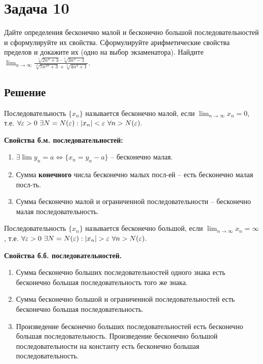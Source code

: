 \section*{Задача 10}

Дайте определения бесконечно малой и бесконечно большой последовательностей и сформулируйте их свойства. Сформулируйте арифметические свойства пределов и докажите их (одно на
выбор экзаменатора). Найдите $\displaystyle \lim_{n\rightarrow \infty} 
        \frac{
               \sqrt[5]{2n^4 + 3} \cdot 
               \sqrt[7]{3n^3 - 1}
             }
             {
               \sqrt[15]{7n^{18} + 3} + 
               \sqrt[3]{4n^4 + 1}
             }.$

\subsection*{Решение}

\begin{definition} Последовательность $ \{ x_ n \} $ называется бесконечно малой, 
    если $\displaystyle \lim_{n \rightarrow \infty} x_n = 0$, т.е. 
    $\forall \varepsilon > 0\ \exists N = N(\varepsilon):|x_n| < \varepsilon\ \forall n > N(\varepsilon).$
\end{definition}

\textbf{Свойства б.м. последовательностей:}
    \begin{enumerate}
        \item $\exists \lim y_n = a \Leftrightarrow \{x_n = y_n - a\}$ -- бесконечно малая.
        \item Сумма \textbf{конечного} числа бесконечно малых посл-ей -- есть бесконечно малая посл-ть.
        \item Сумма бесконечно малой и ограниченной последовательности -- бесконечно малая последовательность.
    \end{enumerate}

\begin{definition} Последовательность $ \{ x_ n \} $ называется бесконечно большой, 
    если $\displaystyle \lim_{n \rightarrow \infty} x_n = \infty$, т.е. 
    $\forall \varepsilon > 0\ \exists N = N(\varepsilon):|x_n| > \varepsilon\ \forall n > N(\varepsilon).$
\end{definition}
\textbf{Свойства б.б. последовательностей.}
    \begin{enumerate}
        \item Сумма бесконечно больших последовательностей одного знака есть бесконечно большая последовательность того же знака.
        \item Сумма бесконечно большой и ограниченной последовательностей есть бесконечно большая последовательность.
        \item Произведение бесконечно больших последовательностей есть бесконечно большая последовательность. Произведение бесконечно большой последовательности на константу есть бесконечно большая последовательность.
    \end{enumerate}


